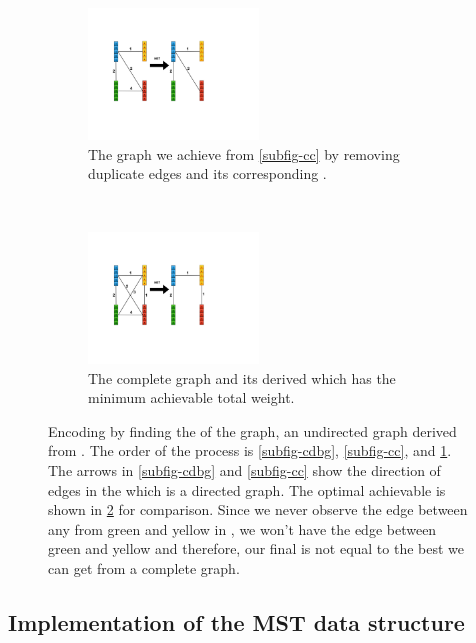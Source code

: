 \begin{figure}[t!]
    \begin{subfigure}[t]{0.5\textwidth}
        \captionsetup{width=0.7\columnwidth}
        \centering
        \includegraphics[width=0.7 \columnwidth, height=3.5cm, trim={1in 2in 2.5in 2in},clip]{figs/mantis/ourCg}
        \caption{The \cc graph we achieve from \ref{subfig-cc} by removing duplicate edges
        and its corresponding \mst.}
        \label{subfig-ourmst}
    \end{subfigure}%
    ~
    \begin{subfigure}[t]{0.5\textwidth}
        \captionsetup{width=0.7\columnwidth}
        \centering
        \includegraphics[width=0.7\columnwidth, height=3.5cm, trim={1in 2in 2.5in 2in},clip]{figs/mantis/optimalCg}
        \caption{The complete \cc graph
        and its derived \mst which has the minimum achievable total weight.}
        \label{subfig-optimalmst}
        \vspace{0.1in}
    \end{subfigure}
    \caption{Encoding \ccs by finding the \mst of the \cc graph, an undirected graph
    derived from \cdbg.
    The order of the process is \ref{subfig-cdbg}, \ref{subfig-cc},
    and \ref{subfig-ourmst}. The arrows in \ref{subfig-cdbg} and \ref{subfig-cc}
    show the direction of edges in the \dbg which is a directed graph. The optimal achievable
    \mst is shown in \ref{subfig-optimalmst} for comparison.
    Since we never observe the edge between any \kmers from \ccs green and yellow in \cdbg,
    we won't have the edge between \ccs green and yellow and therefore, our final \mst
    is not equal to the best \mst we can get from a complete \cc graph.
    }
    \label{fig:mstConstruction}
\end{figure}


\subsection{Implementation of the MST data structure}

